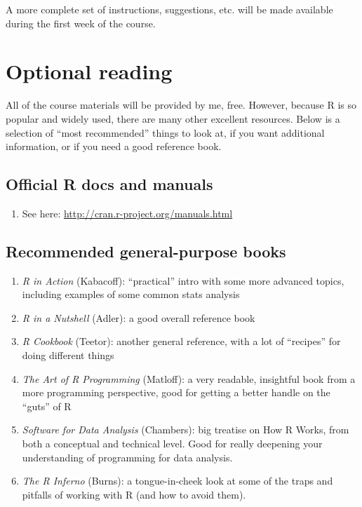 \documentclass{tufte-handout}
\begin{document}
A more complete set of instructions, suggestions, etc. will be made available during the first week of the course.
\section*{Optional reading}
\label{sec-7}

All of the course materials will be provided by me, free. However, because R is so popular and widely used, there are many other excellent resources.  Below is a selection of ``most recommended'' things to look at, if you want additional information, or if you need a good reference book.
\subsection*{Official R docs and manuals}
\label{sec-7-1}

\begin{enumerate}
\item See here: \href{http://cran.r-project.org/manuals.html}{http://cran.r-project.org/manuals.html}
\end{enumerate}
\subsection*{Recommended general-purpose books}
\label{sec-7-2}

\begin{enumerate}
\item \emph{R in Action} (Kabacoff): ``practical'' intro with some more advanced topics, including examples of some common stats analysis
\item \emph{R in a Nutshell} (Adler): a good overall reference book
\item \emph{R Cookbook} (Teetor): another general reference, with a lot of ``recipes'' for doing different things
\item \emph{The Art of R Programming} (Matloff): a very readable, insightful book from a more programming perspective, good for getting a better handle on the ``guts'' of R
\item \emph{Software for Data Analysis} (Chambers): big treatise on How R Works, from both a conceptual and technical level. Good for really deepening your understanding of programming for data analysis.
\item \emph{The R Inferno} (Burns): a tongue-in-cheek look at some of the traps and pitfalls of working with R (and how to avoid them).
\end{enumerate}
\end{document}
